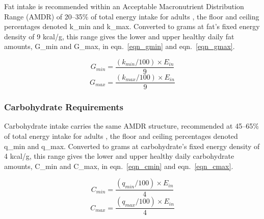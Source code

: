 Fat intake is recommended within an Acceptable Macronutrient Distribution Range (AMDR) of 20–35\% of total energy intake for adults \cite{ref_iom2005}, the floor and ceiling percentages denoted k\_min and k\_max. Converted to grams at fat's fixed energy density of 9 kcal/g, this range gives the lower and upper healthy daily fat amounts, G\_min and G\_max, in eqn.~\eqref{eqn_gmin} and eqn.~\eqref{eqn_gmax}.

\begin{equation}
\label{eqn_gmin}
G_{min} = \frac{(k_{min}/100) × E_{in}}{9}
\end{equation}
\begin{equation}
\label{eqn_gmax}
G_{max} = \frac{(k_{max}/100) × E_{in}}{9}
\end{equation}

\subsubsection{Carbohydrate Requirements}

Carbohydrate intake carries the same AMDR structure, recommended at 45–65\% of total energy intake for adults \cite{ref_iom2005}, the floor and ceiling percentages denoted q\_min and q\_max. Converted to grams at carbohydrate's fixed energy density of 4 kcal/g, this range gives the lower and upper healthy daily carbohydrate amounts, C\_min and C\_max, in eqn.~\eqref{eqn_cmin} and eqn.~\eqref{eqn_cmax}.

\begin{equation}
\label{eqn_cmin}
C_{min} = \frac{(q_{min}/100) × E_{in}}{4}
\end{equation}
\begin{equation}
\label{eqn_cmax}
C_{max} = \frac{(q_{max}/100) × E_{in}}{4}
\end{equation}
